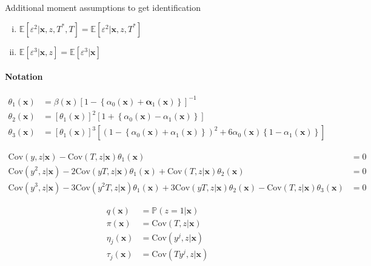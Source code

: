 \noindent Additional moment assumptions to get identification
\begin{assump} \mbox{}
  \label{assump:3rdMoment}
  \begin{enumerate}[(i)] 
    \item $\mathbb{E}[\varepsilon^2|\mathbf{x},z,T^*,T] = \mathbb{E}[\varepsilon^2|\mathbf{x},z, T^*]$
    \item $\mathbb{E}[\varepsilon^3|\mathbf{x},z] = \mathbb{E}[\varepsilon^3|\mathbf{x}]$
  \end{enumerate}
\end{assump}



\paragraph{Notation}

\begin{align}
  \label{eq:theta1_def}
  \theta_1(\mathbf{x}) &= \beta(\mathbf{x})\left[ 1 - \left\{ \alpha_0(\mathbf{x}) + \mathbf{\alpha}_1(\mathbf{x}) \right\} \right]^{-1}\\
  \label{eq:theta2_def}
  \theta_2(\mathbf{x}) &= \left[\theta_1(\mathbf{x})\right]^2 \left[ 1 + \left\{\alpha_0(\mathbf{x}) - \alpha_1(\mathbf{x})\right\}\right] \\
  \label{eq:theta3_def}
  \theta_3(\mathbf{x}) &= \left[\theta_1(\mathbf{x})\right]^3\left[ \left( 1 - \left\{\alpha_0(\mathbf{x}) + \alpha_1(\mathbf{x})\right\} \right)^2 + 6\alpha_0(\mathbf{x})\left\{ 1 - \alpha_1(\mathbf{x}) \right\} \right]
\end{align}

\begin{align*}
  \mbox{Cov}(y,z|\mathbf{x}) - \mbox{Cov}(T,z|\mathbf{x}) \theta_1(\mathbf{x}) &= 0\\
  \mbox{Cov}(y^2,z|\mathbf{x}) - 2\mbox{Cov}(yT,z|\mathbf{x}) \theta_1(\mathbf{x}) + \mbox{Cov}(T,z|\mathbf{x})\theta_2(\mathbf{x}) &= 0\\
  \mbox{Cov}(y^3,z|\mathbf{x}) - 3 \mbox{Cov}(y^2T,z|\mathbf{x}) \theta_1(\mathbf{x}) + 3\mbox{Cov}(yT,z|\mathbf{x}) \theta_2(\mathbf{x}) - \mbox{Cov}(T,z|\mathbf{x}) \theta_3(\mathbf{x})&= 0
\end{align*}

\begin{align*}
  q(\mathbf{x}) &= \mathbb{P}(z=1|\mathbf{x})\\
  \pi(\mathbf{x}) &= \mbox{Cov}(T,z|\mathbf{x})\\
  \eta_j(\mathbf{x}) &= \mbox{Cov}(y^j,z|\mathbf{x})\\
  \tau_j(\mathbf{x}) &= \mbox{Cov}(Ty^j,z|\mathbf{x})
\end{align*}

